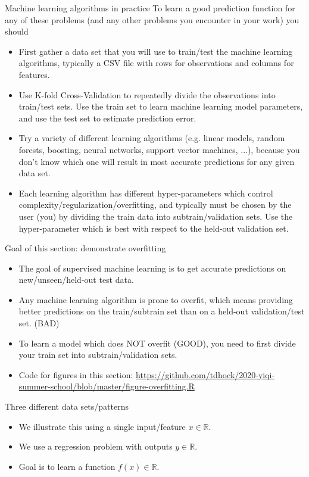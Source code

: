 \documentclass[12pt]{article}
\begin{document}
{Machine learning algorithms in practice}
To learn a good prediction function for any of these problems (and
any other problems you encounter in your work) you should
\begin{itemize}
\item First gather a data set that you will use to train/test the
  machine learning algorithms, typically a CSV file with rows for
  observations and columns for features.
\item Use K-fold Cross-Validation to repeatedly divide the
  observations into train/test sets. Use the train set to learn
  machine learning model parameters, and use the test set to
  estimate prediction error.
\item Try a variety of different learning algorithms (e.g. linear
  models, random forests, boosting, neural networks, support vector
  machines, ...), because you don't know which one will result in
  most accurate predictions for any given data set. 
\item Each learning algorithm has different hyper-parameters which
  control complexity/regularization/overfitting, and typically must
  be chosen by the user (you) by dividing the train data into
  subtrain/validation sets. Use the hyper-parameter which is
  best with respect to the held-out validation set.
\end{itemize}

{Goal of this section: demonstrate overfitting}
\begin{itemize}
\item The goal of supervised machine learning is to get accurate
  predictions on new/unseen/held-out test data.
\item Any machine learning algorithm is prone to overfit, which
  means providing better predictions on the train/subtrain set than
  on a held-out validation/test set. (BAD)
\item To learn a model which does NOT overfit (GOOD), you need to
  first divide your train set into subtrain/validation sets.
\item Code for figures in this section:
  \url{https://github.com/tdhock/2020-yiqi-summer-school/blob/master/figure-overfitting.R}
\end{itemize}

{Three different data sets/patterns}
\begin{itemize}
\item We illustrate this using a single input/feature
  $x\in\mathbb R$.
\item We use a regression problem with outputs $y\in\mathbb R$.
\item Goal is to learn a function $f(x)\in\mathbb R$.
\end{itemize}
\end{document}
